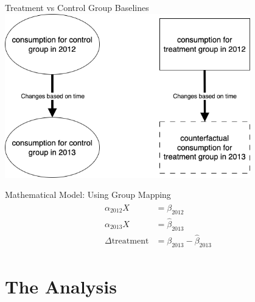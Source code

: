 \documentclass{beamer}
\begin{document}
\begin{frame}{Treatment vs Control Group Baselines}
  \centering
  \includegraphics[width=0.8\textwidth]{images/yoy-mapping.png}
\end{frame}

\begin{frame}{Mathematical Model: Using Group Mapping}
  \begin{align}
    \begin{split}
        \alpha_{2012} X &= \beta_{2012} \\
        \alpha_{2013} X &= \hat\beta_{2013} \\
        \Delta\mbox{treatment} &= \beta_{2013} - \hat\beta_{2013}
    \end{split}
  \end{align}
\end{frame}

\section{The Analysis}
\end{document}
